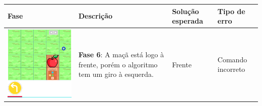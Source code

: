 \begin{quadro}
    \label{quadro:fases_depuracao}
    \begin{longtable}{ | m{} | m{} | m{} | m{} |}
        \hline
        \textbf{Fase}  & \textbf{Descrição} & \textbf{Solução esperada} & \textbf{Tipo de erro} \\ \hline
        \endhead
        
    
         \includegraphics[width=.9\linewidth]{figs/debug/1.png} &
    
         \textbf{Fase 6}: 
         A maçã está logo à frente, porém o algoritmo tem um giro à esquerda. & 
         
         Frente & Comando incorreto
 
         \\ \hline
     
     

\end{longtable}
\end{quadro}
